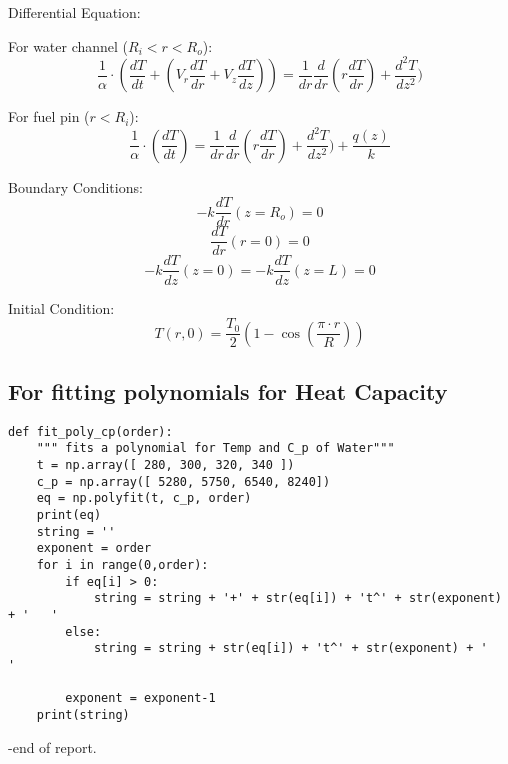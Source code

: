 \documentclass[12pt,letterpaper]{article}
\begin{document}
\pagebreak
Differential Equation:

For water channel ($R_i < r < R_o$):
\[\frac{1}{\alpha} \cdot (\frac{dT}{dt} + (V_r \frac{dT}{dr} + V_z \frac{dT}{dz})) =
  \frac{1}{dr} \frac{d}{dr} (r \frac{dT}{dr}) + \frac{d^2T}{dz^2})\]

For fuel pin ($r < R_i$):
\[\frac{1}{\alpha} \cdot (\frac{dT}{dt}) =
  \frac{1}{dr} \frac{d}{dr} (r \frac{dT}{dr}) + \frac{d^2T}{dz^2}) + \frac{q(z)}{k}\]

Boundary Conditions:
\[-k \frac{dT}{dr}(z=R_o) = 0 \]
\[\frac{dT}{dr}(r=0) = 0\]
\[-k \frac{dT}{dz}(z=0) = -k \frac{dT}{dz}(z=L) = 0 \]
 

Initial Condition:
\[T(r,0) = \frac{T_0}{2} (1-\cos{(\frac{\pi \cdot r}{R})}) \]


\begin{appendices}

\section{For fitting polynomials for Heat Capacity}

\begin{verbatim}
def fit_poly_cp(order):
    """ fits a polynomial for Temp and C_p of Water"""
    t = np.array([ 280, 300, 320, 340 ])
    c_p = np.array([ 5280, 5750, 6540, 8240])
    eq = np.polyfit(t, c_p, order)
    print(eq)
    string = ''
    exponent = order
    for i in range(0,order):
        if eq[i] > 0:
            string = string + '+' + str(eq[i]) + 't^' + str(exponent) + '   '
        else:
            string = string + str(eq[i]) + 't^' + str(exponent) + '   '
            
        exponent = exponent-1
    print(string)

\end{verbatim}


\end{appendices}
\pagebreak

-end of report.
\end{document}
